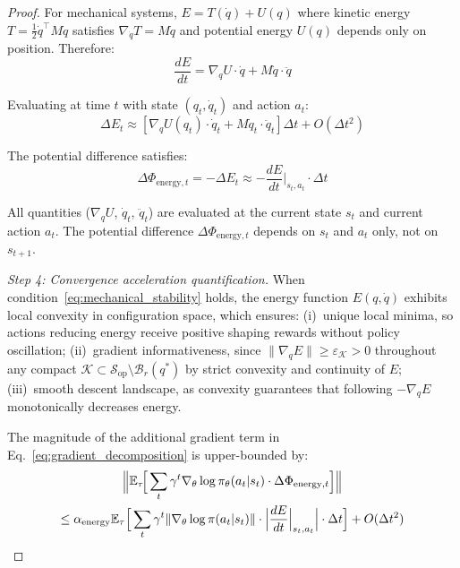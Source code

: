 \documentclass[journal]{IEEEtran}
\begin{document}
\begin{proof}
		For mechanical systems, $E = T(\dot{q}) + U(q)$ where kinetic energy $T = \frac{1}{2}\dot{q}^\top M\dot{q}$ satisfies $\nabla_{\dot{q}} T = M\dot{q}$ and potential energy $U(q)$ depends only on position. Therefore:
		\begin{equation}
			\frac{dE}{dt} = \nabla_q U \cdot \dot{q} + M\dot{q} \cdot \ddot{q}
		\end{equation}
		
		Evaluating at time $t$ with state $(q_t, \dot{q}_t)$ and action $a_t$:
		\begin{equation}
			\Delta E_t \approx \left[\nabla_q U(q_t) \cdot \dot{q}_t + M\dot{q}_t \cdot \ddot{q}_t\right] \Delta t + O(\Delta t^2)
		\end{equation}
		
		The potential difference satisfies:
		\begin{equation}
			\Delta\Phi_{\text{energy},t} = -\Delta E_t \approx -\frac{dE}{dt}\Big|_{s_t,a_t} \cdot \Delta t
			\label{eq:potential_gradient}
		\end{equation}
		
		All quantities ($\nabla_q U$, $\dot{q}_t$, $\ddot{q}_t$) are evaluated at the current state $s_t$ and current action $a_t$. The potential difference $\Delta\Phi_{\text{energy},t}$ depends on $s_t$ and $a_t$ only, not on $s_{t+1}$.
		
		\textit{Step 4: Convergence acceleration quantification.}
		When condition~\eqref{eq:mechanical_stability} holds, the energy function $E(q,\dot{q})$ exhibits local convexity in configuration space, which ensures: (i)~unique local minima, so actions reducing energy receive positive shaping rewards without policy oscillation; (ii)~gradient informativeness, since $\|\nabla_q E\|\geq\varepsilon_{\mathcal{K}}>0$ throughout any compact $\mathcal{K}\subset\mathcal{S}_{\text{op}}\setminus\mathcal{B}_r(q^*)$ by strict convexity and continuity of $E$; (iii)~smooth descent landscape, as convexity guarantees that following $-\nabla_q E$ monotonically decreases energy.
		
		The magnitude of the additional gradient term in Eq.~\eqref{eq:gradient_decomposition} is upper-bounded by:
		\begin{multline}
			\footnotesize
			\Big\|\mathbb{E}_\tau\!\Big[\sum_t \gamma^t \nabla_\theta \log \pi_\theta(a_t|s_t)\cdot\Delta\Phi_{\text{energy},t}\Big]\Big\| \\
			\leq \alpha_{\text{energy}} \mathbb{E}_\tau \Big[ \sum_t \gamma^t \|\nabla_\theta \log \pi(a_t|s_t)\| \cdot \Big|\frac{dE}{dt}\Big|_{s_t,a_t}\Big| \cdot \Delta t \Big] + O(\Delta t^2)
		\end{multline}
		

\end{proof}
\end{document}
